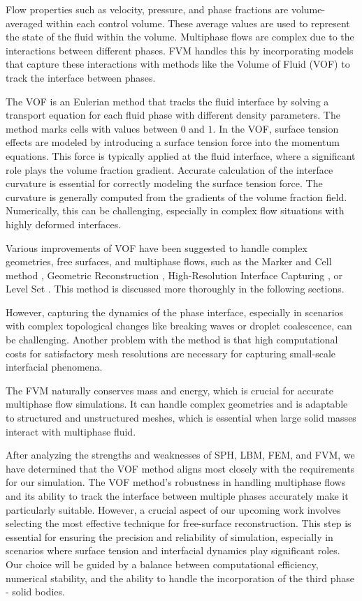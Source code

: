 Flow properties such as velocity, pressure, and phase fractions are volume-averaged within each control volume. These average values are used to represent the state of the fluid within the volume. Multiphase flows are complex due to the interactions between different phases. FVM handles this by incorporating models that capture these interactions with methods like the Volume of Fluid (VOF) to track the interface between phases. 

The VOF is an Eulerian method that tracks the fluid interface by solving a transport equation for each fluid phase with different density parameters. The method marks cells with values between $0$ and $1$. In the VOF, surface tension effects are modeled by introducing a surface tension force into the momentum equations. This force is typically applied at the fluid interface, where a significant role plays the volume fraction gradient. Accurate calculation of the interface curvature is essential for correctly modeling the surface tension force. The curvature is generally computed from the gradients of the volume fraction field. Numerically, this can be challenging, especially in complex flow situations with highly deformed interfaces.

Various improvements of VOF have been suggested to handle complex geometries, free surfaces, and multiphase flows, such as the Marker and Cell method \cite{mac}, Geometric Reconstruction \cite{VOF_reocnstr}, High-Resolution Interface Capturing \cite{HIRC}, or Level Set \cite{VOF_level_set}. This method is discussed more thoroughly in the following sections. 

However, capturing the dynamics of the phase interface, especially in scenarios with complex topological changes like breaking waves or droplet coalescence, can be challenging. Another problem with the method is that high computational costs for satisfactory mesh resolutions are necessary for capturing small-scale interfacial phenomena. 

The FVM naturally conserves mass and energy, which is crucial for accurate multiphase flow simulations. It can handle complex geometries and is adaptable to structured and unstructured meshes, which is essential when large solid masses interact with multiphase fluid.

After analyzing the strengths and weaknesses of SPH, LBM, FEM, and FVM, we have determined that the VOF method aligns most closely with the requirements for our simulation. The VOF method's robustness in handling multiphase flows and its ability to track the interface between multiple phases accurately make it particularly suitable. However, a crucial aspect of our upcoming work involves selecting the most effective technique for free-surface reconstruction. This step is essential for ensuring the precision and reliability of simulation, especially in scenarios where surface tension and interfacial dynamics play significant roles. Our choice will be guided by a balance between computational efficiency, numerical stability, and the ability to handle the incorporation of the third phase - solid bodies.

